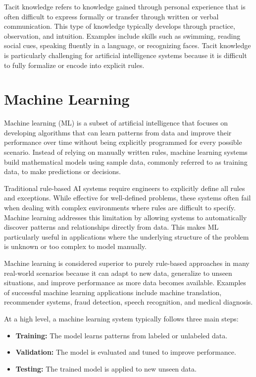 \documentclass{article}
\begin{document}
Tacit knowledge refers to knowledge gained through personal experience that is often difficult to express formally or transfer through written or verbal communication. This type of knowledge typically develops through practice, observation, and intuition. Examples include skills such as swimming, reading social cues, speaking fluently in a language, or recognizing faces. Tacit knowledge is particularly challenging for artificial intelligence systems because it is difficult to fully formalize or encode into explicit rules.

\section{Machine Learning}

Machine learning (ML) is a subset of artificial intelligence that focuses on developing algorithms that can learn patterns from data and improve their performance over time without being explicitly programmed for every possible scenario. Instead of relying on manually written rules, machine learning systems build mathematical models using sample data, commonly referred to as training data, to make predictions or decisions.

Traditional rule-based AI systems require engineers to explicitly define all rules and exceptions. While effective for well-defined problems, these systems often fail when dealing with complex environments where rules are difficult to specify. Machine learning addresses this limitation by allowing systems to automatically discover patterns and relationships directly from data. This makes ML particularly useful in applications where the underlying structure of the problem is unknown or too complex to model manually.

Machine learning is considered superior to purely rule-based approaches in many real-world scenarios because it can adapt to new data, generalize to unseen situations, and improve performance as more data becomes available. Examples of successful machine learning applications include machine translation, recommender systems, fraud detection, speech recognition, and medical diagnosis.

At a high level, a machine learning system typically follows three main steps:
\begin{itemize}
    \item \textbf{Training:} The model learns patterns from labeled or unlabeled data.
    \item \textbf{Validation:} The model is evaluated and tuned to improve performance.
    \item \textbf{Testing:} The trained model is applied to new unseen data.
\end{itemize}
\end{document}

